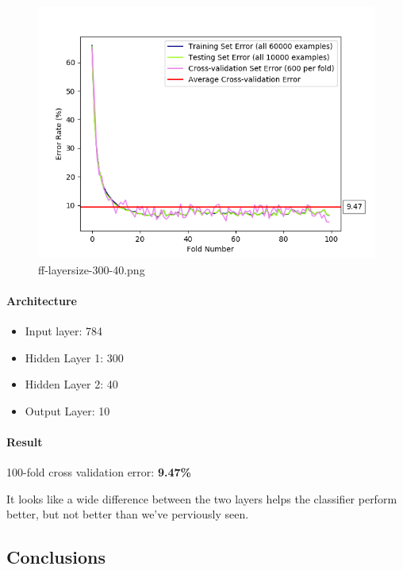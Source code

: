 \documentclass[11pt]{article}
\makeatletter
\def\maxwidth{\ifdim\Gin@nat@width>\linewidth\linewidth
    \else\Gin@nat@width\fi}
\let\Oldincludegraphics\includegraphics
\renewcommand{\includegraphics}[1]{\Oldincludegraphics[width=.8\maxwidth]{#1}}
\providecommand{\tightlist}{%
      \setlength{\itemsep}{0pt}\setlength{\parskip}{0pt}}
\makeatother
\begin{document}
\begin{figure}[htbp]
\centering
\includegraphics{plots/ff-layersize-300-40.png}
\caption{ff-layersize-300-40.png}
\end{figure}

\paragraph{Architecture}\label{architecture-6}

\begin{itemize}
\tightlist
\item
  Input layer: 784
\item
  Hidden Layer 1: 300
\item
  Hidden Layer 2: 40
\item
  Output Layer: 10
\end{itemize}

\paragraph{Result}\label{result-6}

100-fold cross validation error: \textbf{9.47\%}

It looks like a wide difference between the two layers helps the
classifier perform better, but not better than we've perviously seen.

\subsection{Conclusions}\label{conclusions}
\end{document}

